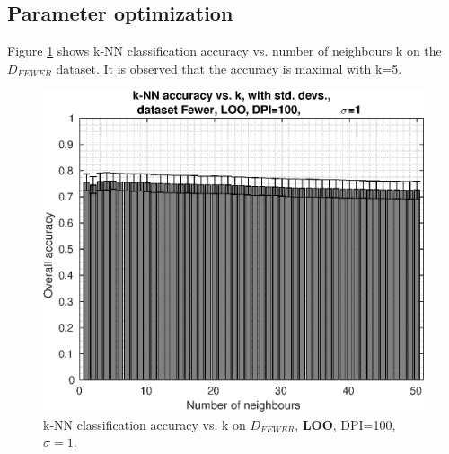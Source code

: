 \subsection{Parameter optimization}
Figure \ref{fig:pca-knn-acc-vs-k} shows k-NN classification
accuracy vs. number of neighbours k on the \(D_{FEWER}\) dataset.
It is observed that the accuracy is maximal with k=5.
\begin{figure}[h]
\centering
\includegraphics[width=\figscale]{img/pca-knn-acc-vs-k-dpi100-sigma1}
\caption[k-NN classification accuracy vs. k on $D_{FEWER}$, \textbf{LOO}.]
{
k-NN classification accuracy vs. k on $D_{FEWER}$, \textbf{LOO}, DPI=100, $\sigma=1$.
}
\label{fig:pca-knn-acc-vs-k}
\end{figure}

